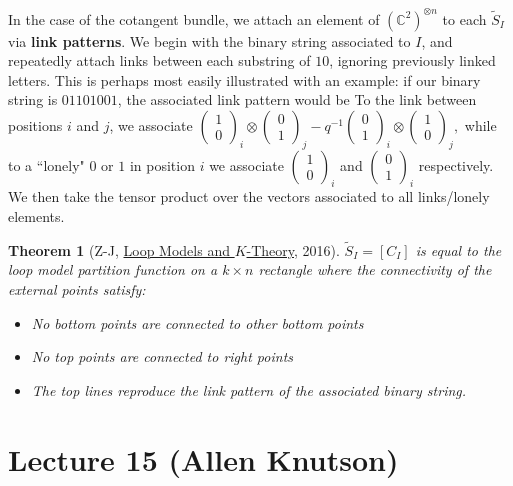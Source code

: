 \documentclass[12pt]{amsart}
\numberwithin{equation}{section}
\newtheorem{Theorem}[equation]{Theorem}
\theoremstyle{definition}
\numberwithin{figure}{section}
\newcommand{\C}{\mathbb{C}}
\newcommand{\Stil}{\tilde{S}}
\begin{document}
In the case of the cotangent bundle, we attach an element of $(\C^2)^{\otimes n}$ to each $\Stil_I$ via \textbf{link patterns}. We begin with the binary string associated to $I$, and repeatedly attach links between each substring of $1 0$, ignoring previously linked letters. This is perhaps most easily illustrated with an example: if our binary string is $01101001$, the associated link pattern would be 
To the link  between positions $i$ and $j$, we associate
$\begin{pmatrix}
	1\\
	0
\end{pmatrix}_i
\otimes
\begin{pmatrix}
	0\\
	1
\end{pmatrix}_j
-
q^{-1}
\begin{pmatrix}
	0\\
	1
\end{pmatrix}_i
\otimes
\begin{pmatrix}
	1\\
	0
\end{pmatrix}_j,
$
while to a ``lonely" $0$ or $1$ in position $i$ we associate $\begin{pmatrix} 1\\ 0\end{pmatrix}_i$ and $\begin{pmatrix} 0\\ 1\end{pmatrix}_i$ respectively. We then take the tensor product over the vectors associated to all links/lonely elements. 

\begin{Theorem}[Z-J, \href{https://doi.org/10.3842/SIGMA.2018.069}{Loop Models and $K$-Theory}, 2016]
	$\Stil_I = [C_I]$ is equal to the loop model partition function on a $k \times n$ rectangle where the connectivity of the external points satisfy:
	\begin{itemize}
		\item No bottom points are connected to other bottom points
		\item No top points are connected to right points
		\item The top lines reproduce the link pattern of the associated binary string.
	\end{itemize}
\end{Theorem}

\section{Lecture 15 (Allen Knutson)}
\end{document}
